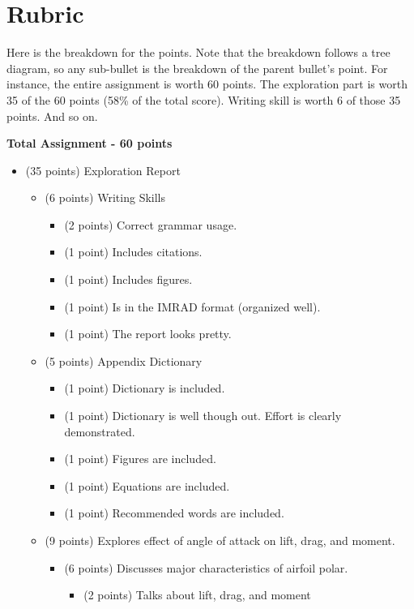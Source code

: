 \documentclass[12pt]{article}
\begin{document}
	
	\section{Rubric}
	
	Here is the breakdown for the points.  Note that the breakdown follows a tree diagram, so any sub-bullet is the breakdown of the parent bullet's point. For instance, the entire assignment is worth 60 points. The exploration part is worth 35 of the 60 points (58\% of the total score). Writing skill is worth 6 of those 35 points. And so on.  
	
	\bigskip
	
	\textbf{Total Assignment - 60 points}
	
\begin{itemize}
	\item (35 points) Exploration Report
	\begin{itemize}
		\item (6 points) Writing Skills
		\begin{itemize}
			\item (2 points) Correct grammar usage.
			\item (1 point) Includes citations.
			\item (1 point) Includes figures.
			\item (1 point) Is in the IMRAD format (organized well).
			\item (1 point) The report looks pretty.
		\end{itemize}
		\item (5 points) Appendix Dictionary
		\begin{itemize}
			\item (1 point) Dictionary is included.
			\item (1 point) Dictionary is well though out. Effort is clearly demonstrated.
			\item (1 point) Figures are included.
			\item (1 point) Equations are included.
			\item (1 point) Recommended words are included.
		\end{itemize}
		\item (9 points) Explores effect of angle of attack on lift, drag, and moment.
		\begin{itemize}
			\item (6 points) Discusses major characteristics of airfoil polar.
			\begin{itemize}
				\item (2 points) Talks about lift, drag, and moment

\end{itemize}
\end{itemize}
\end{itemize}
\end{itemize}
\end{document}
